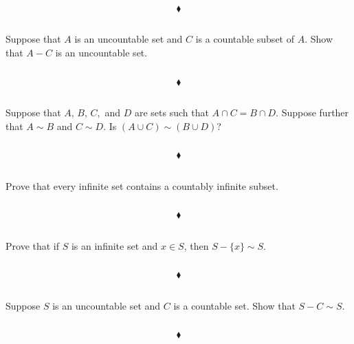 $$\blacklozenge$$

\subsection{}
\begin{tcolorbox}
Suppose that $A$ is an uncountable set and $C$ is a countable subset of $A$. Show that $A- C$ is an uncountable set. 

\end{tcolorbox}
$$ $$

$$\blacklozenge$$

\subsection{}
\begin{tcolorbox}
Suppose that $A,\, B,\, C,$ and $D$ are sets such that $A \cap C = B\cap D$. Suppose further that $A\sim  B$ and $C\sim  D$. Is $(A \cup C) \sim (B\cup  D)$? 
\end{tcolorbox}
$$ $$

$$\blacklozenge$$

\subsection{}
\begin{tcolorbox}
Prove that every infinite set contains a countably infinite subset. 
\end{tcolorbox}
$$ $$

$$\blacklozenge$$

\subsection{}
\begin{tcolorbox}
Prove that if $S$ is an infinite set and $x \in S$, then $S - \{x\} \sim S$. 
\end{tcolorbox}
$$ $$

$$\blacklozenge$$

\subsection{}
\begin{tcolorbox}
Suppose $S$ is an uncountable set and $C$ is a countable set. Show that $S - C\sim S$. 
\end{tcolorbox}
$$ $$

$$\blacklozenge$$

\newpage
\setcounter{section}{28}
